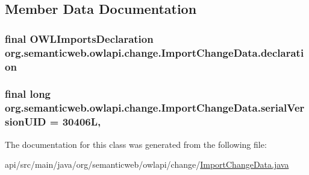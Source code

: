 \subsection{Member Data Documentation}
\hypertarget{classorg_1_1semanticweb_1_1owlapi_1_1change_1_1_import_change_data_a23afda3aff2c6ee273efff9db5bb5315}{
\subsubsection[{declaration}]{\setlength{\rightskip}{0pt plus 5cm}final {\bf O\-W\-L\-Imports\-Declaration} org.\-semanticweb.\-owlapi.\-change.\-Import\-Change\-Data.\-declaration\hspace{0.3cm}{\ttfamily [private]}}}\label{classorg_1_1semanticweb_1_1owlapi_1_1change_1_1_import_change_data_a23afda3aff2c6ee273efff9db5bb5315}
\hypertarget{classorg_1_1semanticweb_1_1owlapi_1_1change_1_1_import_change_data_a85b4b9503a36d47efb471c0be78c7a89}{
\subsubsection[{serial\-Version\-U\-I\-D}]{\setlength{\rightskip}{0pt plus 5cm}final long org.\-semanticweb.\-owlapi.\-change.\-Import\-Change\-Data.\-serial\-Version\-U\-I\-D = 30406\-L\hspace{0.3cm}{\ttfamily [static]}, {\ttfamily [private]}}}\label{classorg_1_1semanticweb_1_1owlapi_1_1change_1_1_import_change_data_a85b4b9503a36d47efb471c0be78c7a89}


The documentation for this class was generated from the following file\-:\begin{DoxyCompactItemize}
\item 
api/src/main/java/org/semanticweb/owlapi/change/\hyperlink{_import_change_data_8java}{Import\-Change\-Data.\-java}\end{DoxyCompactItemize}
